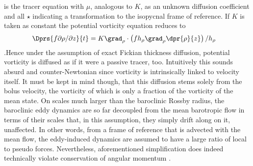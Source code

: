  is the tracer equation with $\mu$, analogous to $K$, as an unknown diffusion coefficient and all $\star$ indicating a transformation to the isopycnal frame of reference.
 If $K$ is taken as constant the potential vorticity equation reduces to
\begin{align}
	\Dprs{f\partial \rho / \partial z}{t}
	&=
	K \grad_{\rho} \cdot \left( f h_{\rho} \grad_{\rho} \dpr{\rho}{z} \right) /h_{\rho} \label{vort-diff}
\end{align}
.Hence under the assumption of
exact Fickian thickness diffusion, potential vorticity is diffused as if it were
a passive tracer, too. Intuitively this sounds absurd and counter-Newtonian
since vorticity is intrinsically linked to velocity itself. It must be kept in
mind though, that this diffusion stems solely from the bolus velocity, the
vorticity of which is only a fraction of the vorticity of the mean state. On
scales much larger than the baroclinic Rossby radius, the baroclinic eddy
dynamics are so far decoupled from the mean barotropic flow in terms of their
scales that, in this assumption, they simply drift along on it, unaffected. In
other words, from a frame of reference that is advected with the mean flow, the
eddy-induced dynamics are assumed to have a large ratio of local to pseudo
forces.
Nevertheless, aforementioned simplification does indeed technically violate
conservation of angular momentum \citep{Rhines2006}.

